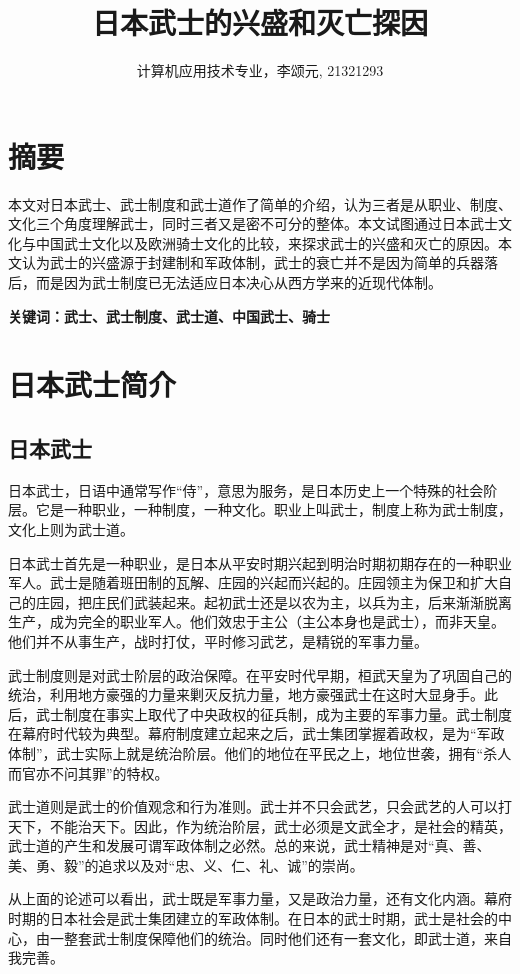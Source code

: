 \documentclass[utf8,a4paper]{ctexart}
\title{日本武士的兴盛和灭亡探因}
\author{计算机应用技术专业，李颂元, 21321293}
\begin{document}
\maketitle
\section*{摘要}
本文对日本武士、武士制度和武士道作了简单的介绍，认为三者是从职业、制度、文化三个角度理解武士，同时三者又是密不可分的整体。本文试图通过日本武士文化与中国武士文化以及欧洲骑士文化的比较，来探求武士的兴盛和灭亡的原因。本文认为武士的兴盛源于封建制和军政体制，武士的衰亡并不是因为简单的兵器落后，而是因为武士制度已无法适应日本决心从西方学来的近现代体制。

\textbf{关键词：武士、武士制度、武士道、中国武士、骑士}
\tableofcontents
\section{日本武士简介}
\subsection{日本武士}
日本武士，日语中通常写作“侍”，意思为服务，是日本历史上一个特殊的社会阶层。它是一种职业，一种制度，一种文化。职业上叫武士，制度上称为武士制度，文化上则为武士道。

日本武士首先是一种职业，是日本从平安时期兴起到明治时期初期存在的一种职业军人。武士是随着班田制的瓦解、庄园的兴起而兴起的。庄园领主为保卫和扩大自己的庄园，把庄民们武装起来。起初武士还是以农为主，以兵为主，后来渐渐脱离生产，成为完全的职业军人\cite{zhe03}。他们效忠于主公（主公本身也是武士），而非天皇。他们并不从事生产，战时打仗，平时修习武艺，是精锐的军事力量。

武士制度则是对武士阶层的政治保障。在平安时代早期，桓武天皇为了巩固自己的统治，利用地方豪强的力量来剿灭反抗力量，地方豪强武士在这时大显身手\cite{wushiriben13}。此后，武士制度在事实上取代了中央政权的征兵制，成为主要的军事力量。武士制度在幕府时代较为典型。幕府制度建立起来之后，武士集团掌握着政权，是为“军政体制”，武士实际上就是统治阶层。他们的地位在平民之上，地位世袭，拥有“杀人而官亦不问其罪”的特权\cite{zhe03}。

武士道则是武士的价值观念和行为准则。武士并不只会武艺，只会武艺的人可以打天下，不能治天下。因此，作为统治阶层，武士必须是文武全才，是社会的精英，武士道的产生和发展可谓军政体制之必然。总的来说，武士精神是对“真、善、美、勇、毅”的追求以及对“忠、义、仁、礼、诚”的崇尚\cite{wang08}。

从上面的论述可以看出，武士既是军事力量，又是政治力量，还有文化内涵。幕府时期的日本社会是武士集团建立的军政体制。在日本的武士时期，武士是社会的中心，由一整套武士制度保障他们的统治。同时他们还有一套文化，即武士道，来自我完善。
\end{document}
